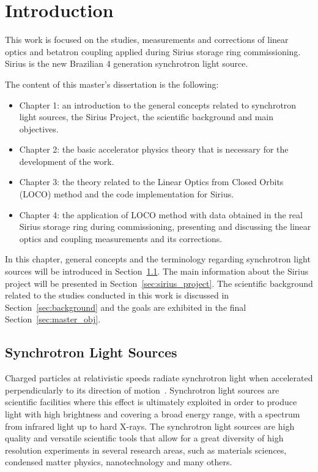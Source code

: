 \chapter{Introduction} \label{chap:intro}
This work is focused on the studies, measurements and corrections of linear optics and betatron coupling applied during Sirius storage ring commissioning. Sirius is the new Brazilian 4 generation synchrotron light source. 

The content of this master's dissertation is the following:
\begin{itemize}
    \item Chapter 1: an introduction to the general concepts related to synchrotron light sources, the Sirius Project, the scientific background and main objectives.
    \item Chapter 2: the basic accelerator physics theory that is necessary for the development of the work.
    \item Chapter 3: the theory related to the Linear Optics from Closed Orbits (LOCO) method and the code implementation for Sirius.
    \item Chapter 4: the application of LOCO method with data obtained in the real Sirius storage ring during commissioning, presenting and discussing the linear optics and coupling measurements and its corrections.
\end{itemize}

In this chapter, general concepts and the terminology regarding synchrotron light sources will be introduced in Section~\ref{sec:sls}. The main information about the Sirius project will be presented in Section~\ref{sec:sirius_project}. The scientific background related to the studies conducted in this work is discussed in Section~\ref{sec:background} and the goals are exhibited in the final Section~\ref{sec:master_obj}.
\section{Synchrotron Light Sources}\label{sec:sls}
Charged particles at relativistic speeds radiate synchrotron light when accelerated perpendicularly to its direction of motion~\cite{jackson}. Synchrotron light sources are scientific facilities where this effect is ultimately exploited in order to produce light with high brightness and covering a broad energy range, with a spectrum from infrared light up to hard X-rays. The synchrotron light sources are high quality and versatile scientific tools that allow for a great diversity of high resolution experiments in several research areas, such as materials sciences, condensed matter physics, nanotechnology and many others.

